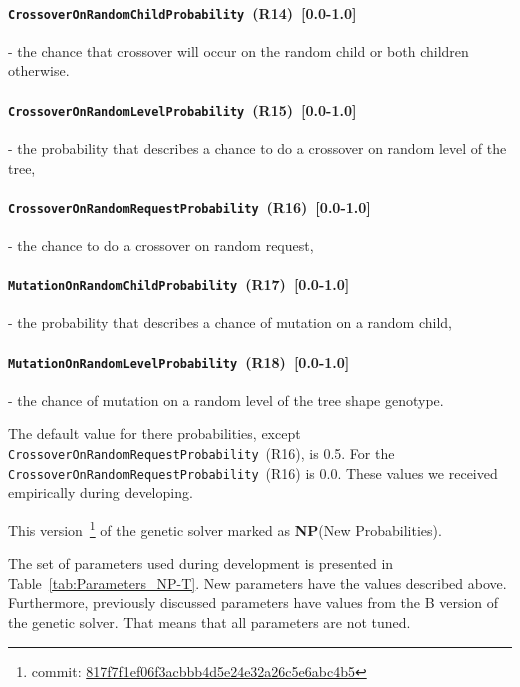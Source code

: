 \paragraph{\texttt{CrossoverOnRandomChildProbability}~(R14)~[0.0-1.0]} - the chance that crossover will occur on the random child or both children otherwise.
\paragraph{\texttt{CrossoverOnRandomLevelProbability}~(R15)~[0.0-1.0]} - the probability that describes a chance to do a crossover on random level of the tree, 
\paragraph{\texttt{CrossoverOnRandomRequestProbability}~(R16)~[0.0-1.0]} - the chance to do a crossover on random request,
\paragraph{\texttt{MutationOnRandomChildProbability}~(R17)~[0.0-1.0]} - the probability that describes a chance of mutation on a random child,
\paragraph{\texttt{MutationOnRandomLevelProbability}~(R18)~[0.0-1.0]} - the chance of mutation on a random level of the tree shape genotype.

The default value for there probabilities, except \texttt{CrossoverOnRandomRequestProbability}~(R16), is 0.5. For the \texttt{CrossoverOnRandomRequestProbability}~(R16) is 0.0. These values we received empirically during developing.

This version~\footnote{commit: \href{https://git-st.inf.tu-dresden.de/mquat/mquat2/commit/817f7f1ef06f3acbbb4d5e24e32a26c5e6abc4b5}{817f7f1ef06f3acbbb4d5e24e32a26c5e6abc4b5}} of the genetic solver marked as \textbf{NP}(New Probabilities).

The set of parameters used during development is presented in Table~\ref{tab:Parameters_NP-T}. New parameters have the values described above. Furthermore, previously discussed parameters have values from the B version of the genetic solver. That means that all parameters are not tuned.

